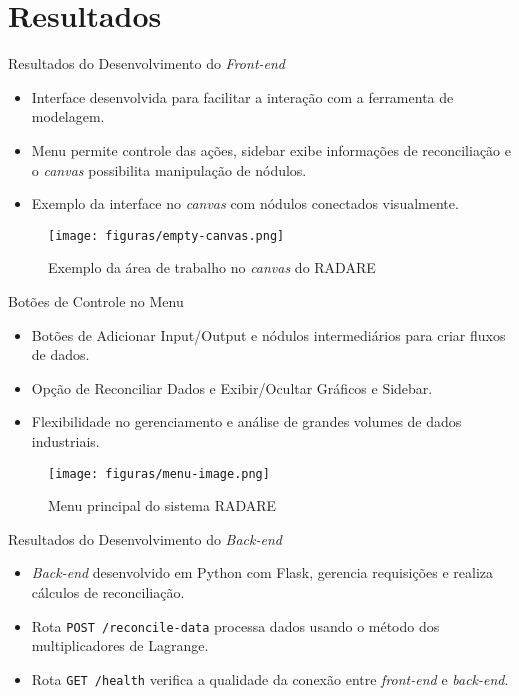 \section{Resultados}

\begin{frame}{Resultados do Desenvolvimento do \textit{Front-end}}
    \begin{itemize}
        \item Interface desenvolvida para facilitar a interação com a ferramenta de modelagem.
        \item Menu permite controle das ações, sidebar exibe informações de reconciliação e o \textit{canvas} possibilita manipulação de nódulos.
        \item Exemplo da interface no \textit{canvas} com nódulos conectados visualmente.
    \end{itemize}
    \begin{figure}
        \centering
        \texttt{[image: figuras/empty-canvas.png]}
        \caption{Exemplo da área de trabalho no \textit{canvas} do RADARE}
    \end{figure}
\end{frame}

\begin{frame}{Botões de Controle no Menu}
    \begin{itemize}
        \item Botões de Adicionar Input/Output e nódulos intermediários para criar fluxos de dados.
        \item Opção de Reconciliar Dados e Exibir/Ocultar Gráficos e Sidebar.
        \item Flexibilidade no gerenciamento e análise de grandes volumes de dados industriais.
    \end{itemize}
    \begin{figure}
        \centering
        \texttt{[image: figuras/menu-image.png]}
        \caption{Menu principal do sistema RADARE}
    \end{figure}
\end{frame}

\begin{frame}{Resultados do Desenvolvimento do \textit{Back-end}}
    \begin{itemize}
        \item \textit{Back-end} desenvolvido em Python com Flask, gerencia requisições e realiza cálculos de reconciliação.
        \item Rota \texttt{POST /reconcile-data} processa dados usando o método dos multiplicadores de Lagrange.
        \item Rota \texttt{GET /health} verifica a qualidade da conexão entre \textit{front-end} e \textit{back-end}.
    \end{itemize}
\end{frame}

